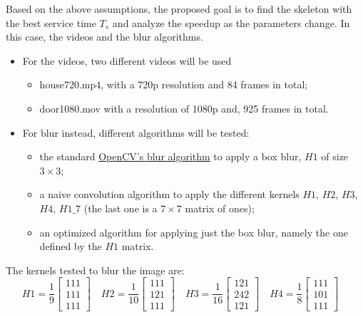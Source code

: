 Based on the above assumptions, the proposed goal is to find the skeleton with the best service time $T_s$ and analyze the speedup as the parameters change. In this case, the videos and the blur algorithms. 
\begin{itemize}
	\item For the videos, two different videos will be used
	      \begin{itemize}
	      	\item house720.mp4, with a 720p resolution and 84 frames in total;
	      	\item door1080.mov with a resolution of 1080p and, 925 frames in total.
	      \end{itemize}
	      
	\item For blur instead, different algorithms will be tested:
	      \begin{itemize}
	      	\item  the standard \href{https://docs.opencv.org/3.4/d4/d86/group__imgproc__filter.html#ga8c45db9afe636703801b0b2e440fce37}{OpenCV's blur algorithm} to apply a box blur, $H1$ of size $3\times3$;
	      	\item a naive convolution algorithm to apply the different kernels $H1$, $H2$, $H3$, $H4$, $H1\_7$ (the last one is a $7\times7$ matrix of ones);
	      	\item an optimized algorithm for applying just the box blur, namely the one defined by the $H1$ matrix.
	      \end{itemize}
\end{itemize}

The kernels tested to blur the image are:
$$
H1=\frac{1}{9}\left[\begin{array}{l}111 \\111 \\111\end{array}\right] \quad
H2=\frac{1}{10}\left[\begin{array}{l}111 \\121 \\111\end{array}\right] \quad
H3=\frac{1}{16}\left[\begin{array}{l}121 \\242 \\121\end{array}\right] \quad
H4=\frac{1}{8}\left[\begin{array}{l}111 \\101 \\111\end{array}\right] \quad
$$